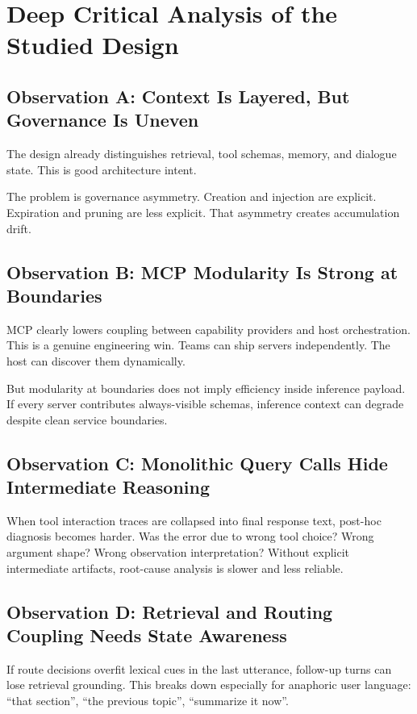 \documentclass[conference]{IEEEtran}
\begin{document}
\section{Deep Critical Analysis of the Studied Design}
\label{sec:critical}

\subsection{Observation A: Context Is Layered, But Governance Is Uneven}

The design already distinguishes retrieval,
tool schemas,
memory,
and dialogue state.
This is good architecture intent.

The problem is governance asymmetry.
Creation and injection are explicit.
Expiration and pruning are less explicit.
That asymmetry creates accumulation drift.

\subsection{Observation B: MCP Modularity Is Strong at Boundaries}

MCP clearly lowers coupling between capability providers and host orchestration.
This is a genuine engineering win.
Teams can ship servers independently.
The host can discover them dynamically.

But modularity at boundaries does not imply efficiency inside inference payload.
If every server contributes always-visible schemas,
inference context can degrade despite clean service boundaries.

\subsection{Observation C: Monolithic Query Calls Hide Intermediate Reasoning}

When tool interaction traces are collapsed into final response text,
post-hoc diagnosis becomes harder.
Was the error due to wrong tool choice?
Wrong argument shape?
Wrong observation interpretation?
Without explicit intermediate artifacts,
root-cause analysis is slower and less reliable.

\subsection{Observation D: Retrieval and Routing Coupling Needs State Awareness}

If route decisions overfit lexical cues in the last utterance,
follow-up turns can lose retrieval grounding.
This breaks down especially for anaphoric user language:
``that section'',
``the previous topic'',
``summarize it now''.
\end{document}
